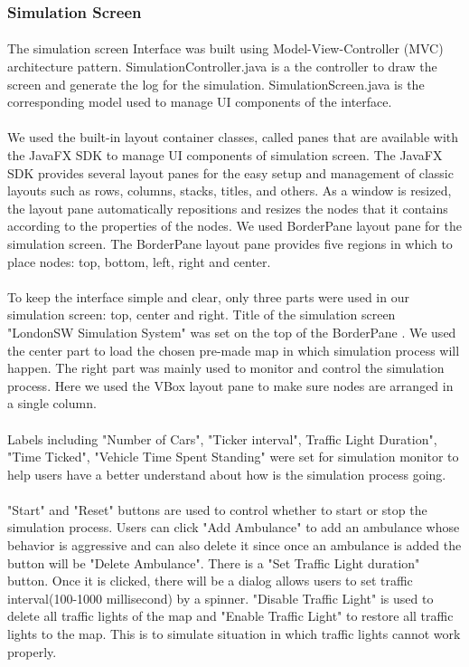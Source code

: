 \documentclass[a4paper,11pt,titlepage]{article}
\begin{document}
\subsubsection{Simulation Screen}
\paragraph{}
The simulation screen Interface was built using Model-View-Controller (MVC) architecture pattern. SimulationController.java is a the controller to draw the screen and generate the log for the simulation. SimulationScreen.java is the corresponding model used to manage UI components of the interface. 
\paragraph{}
We used the built-in layout container classes, called panes that are available with the JavaFX SDK to manage UI components of simulation screen. The JavaFX SDK provides several layout panes for the easy setup and management of classic layouts such as rows, columns, stacks, titles, and others. As a window is resized, the layout pane automatically repositions and resizes the nodes that it contains according to the properties of the nodes. We used BorderPane layout pane for the simulation screen. The BorderPane layout pane provides five regions in which to place nodes: top, bottom, left, right and center. 
\paragraph{}
To keep the interface simple and clear, only three parts were used in our simulation screen: top, center and right. Title of the simulation screen "LondonSW Simulation System" was set on the top of the BorderPane . We used the center part to load the chosen pre-made map in which simulation process will happen. The right part was mainly used to monitor and control the simulation process. Here we used the VBox layout pane to make sure nodes are arranged in a single column. 
\paragraph{}
Labels including "Number of Cars", "Ticker interval", Traffic Light Duration", "Time Ticked", "Vehicle Time Spent Standing" were set for simulation monitor to help users have a better understand about how is the simulation process going. 
\paragraph{}
"Start" and "Reset" buttons are used to control whether to start or stop the simulation process. Users can click "Add Ambulance" to add an ambulance whose behavior is aggressive and can also delete it since once an ambulance is added the button will be "Delete Ambulance". There is a "Set Traffic Light duration" button. Once it is clicked, there will be a dialog allows users to set traffic interval(100-1000 millisecond) by a spinner. "Disable Traffic Light" is used to delete all traffic lights of the map and "Enable Traffic Light" to restore all traffic lights to the map. This is to simulate situation in which traffic lights cannot work properly. 
\end{document}
